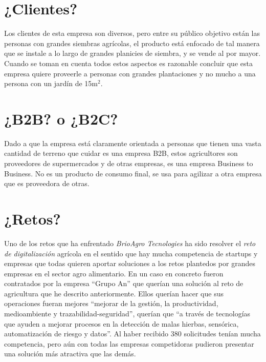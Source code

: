 \documentclass{article}
\begin{document}
\section{¿Clientes?}
Los clientes de esta empresa son diversos, pero entre su público objetivo están las personas con grandes siembras agrícolas, el producto está enfocado de tal manera que se instale a lo largo de grandes planicies de siembra, y se vende al por mayor. Cuando se toman en cuenta todos estos aspectos es razonable concluir que esta empresa quiere proveerle a personas con grandes plantaciones y no mucho a una persona con un jardín de 15m$^2$.


\section{¿B2B? o ¿B2C?}
Dado a que la empresa está claramente orientada a personas que tienen una vasta cantidad de terreno que cuidar es una empresa B2B, estos agricultores son proveedores de supermercados y de otras empresas, es una empresa Business to Business. No es un producto de consumo final, se usa para agilizar a otra empresa que es proveedora de otras.


\section{¿Retos?}
Uno de los retos que ha enfrentado \emph{BrioAgro Tecnologies} ha sido resolver el \emph{reto de digitalización} agrícola en el sentido que hay mucha competencia de startups y empresas que todas quieren aportar soluciones a los retos plantedos por grandes empresas en el sector agro alimentario. En un caso en concreto fueron contratados por la empresa ``Grupo An'' que querían una solución al reto de agricultura que he descrito anteriormente. Ellos querían hacer que sus operaciones fueran mejores ``mejorar de la gestión, la productividad, medioambiente y trazabilidad-seguridad'', querían que ``a través de tecnologías que ayuden a mejorar procesos en la detección de malas hierbas, sensórica, automatización de riesgo y datos''. Al haber recibido 380 solicitudes tenían mucha competencia, pero aún con todas las empresas competidoras pudieron presentar una solución más atractiva que las demás.
\end{document}

